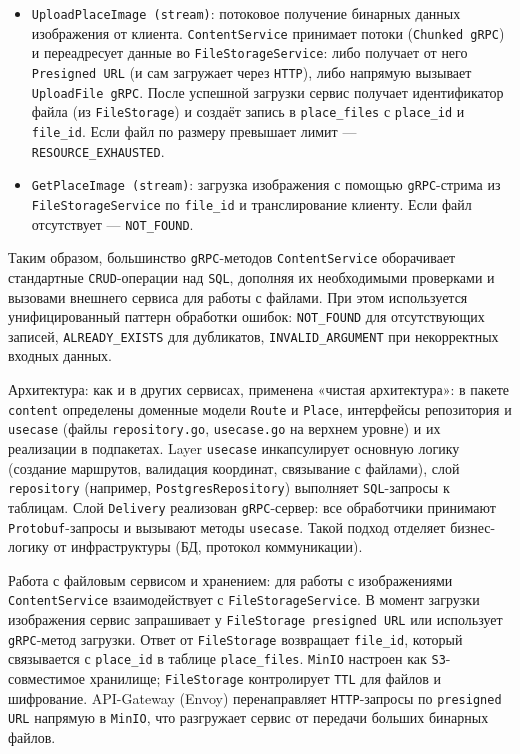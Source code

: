 \begin{itemize}
    \item \texttt{UploadPlaceImage (stream)}: потоковое получение бинарных данных изображения от клиента. \texttt{ContentService} принимает потоки (\texttt{Chunked gRPC}) и переадресует данные во \texttt{FileStorageService}: либо получает от него \texttt{Presigned URL} (и сам загружает через \texttt{HTTP}), либо напрямую вызывает \texttt{UploadFile gRPC}. После успешной загрузки сервис получает идентификатор файла (из \texttt{FileStorage}) и создаёт запись в \texttt{place\_files} с \texttt{place\_id} и \texttt{file\_id}. Если файл по размеру превышает лимит — \\ \texttt{RESOURCE\_EXHAUSTED}.
    \item \texttt{GetPlaceImage (stream)}: загрузка изображения с помощью \texttt{gRPC}-стрима из \texttt{FileStorageService} по \texttt{file\_id} и транслирование клиенту. Если файл отсутствует — \texttt{NOT\_FOUND}.
\end{itemize}
Таким образом, большинство \texttt{gRPC}-методов \texttt{ContentService} оборачивает стандартные \texttt{CRUD}-операции над \texttt{SQL}, дополняя их необходимыми проверками и вызовами внешнего сервиса для работы с файлами. При этом используется унифицированный паттерн обработки ошибок: \texttt{NOT\_FOUND} для отсутствующих записей, \texttt{ALREADY\_EXISTS} для дубликатов, \texttt{INVALID\_ARGUMENT} при некорректных входных данных.

Архитектура: как и в других сервисах, применена «чистая архитектура»: в пакете \texttt{content} определены доменные модели \texttt{Route} и \texttt{Place}, интерфейсы репозитория и \texttt{usecase} (файлы \texttt{repository.go}, \texttt{usecase.go} на верхнем уровне) и их реализации в подпакетах. Layer \texttt{usecase} инкапсулирует основную логику (создание маршрутов, валидация координат, связывание с файлами), слой \texttt{repository} (например, \texttt{PostgresRepository}) выполняет \texttt{SQL}-запросы к таблицам. Слой \texttt{Delivery} реализован \texttt{gRPC}-сервер: все обработчики принимают \texttt{Protobuf}-запросы и вызывают методы \texttt{usecase}. Такой подход отделяет бизнес-логику от инфраструктуры (БД, протокол коммуникации).

Работа с файловым сервисом и хранением: для работы с изображениями \texttt{ContentService} взаимодействует с \texttt{FileStorageService}. В момент загрузки изображения сервис запрашивает у \texttt{FileStorage presigned URL} или использует \texttt{gRPC}-метод загрузки. Ответ от \texttt{FileStorage} возвращает \texttt{file\_id}, который связывается с \texttt{place\_id} в таблице \texttt{place\_files}. \texttt{MinIO} настроен как \texttt{S3}-совместимое хранилище; \texttt{FileStorage} контролирует \texttt{TTL} для файлов и шифрование. API-Gateway (Envoy) перенаправляет \texttt{HTTP}-запросы по \texttt{presigned URL} напрямую в \texttt{MinIO}, что разгружает сервис от передачи больших бинарных файлов.

